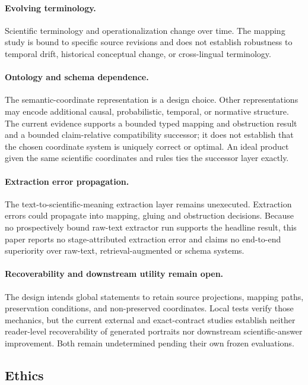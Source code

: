 \paragraph{Evolving terminology.}
Scientific terminology and operationalization change over time. The mapping
study is bound to specific source revisions and does not establish robustness
to temporal drift, historical conceptual change, or cross-lingual terminology.

\paragraph{Ontology and schema dependence.}
The semantic-coordinate representation is a design choice. Other
representations may encode additional causal, probabilistic, temporal, or
normative structure. The current evidence supports a bounded typed mapping and
obstruction result and a bounded claim-relative compatibility successor; it
does not establish that the chosen coordinate system is uniquely correct or
optimal. An ideal product given the same scientific coordinates and rules ties
the successor layer exactly.

\paragraph{Extraction error propagation.}
The text-to-scientific-meaning extraction layer remains unexecuted. Extraction
errors could propagate into mapping, gluing and obstruction decisions. Because
no prospectively bound raw-text extractor run supports the headline result,
this paper reports no stage-attributed extraction error and claims no
end-to-end superiority over raw-text, retrieval-augmented or schema systems.

\paragraph{Recoverability and downstream utility remain open.}
The design intends global statements to retain source projections, mapping
paths, preservation conditions, and non-preserved coordinates. Local tests
verify those mechanics, but the current external and exact-contract studies
establish neither reader-level recoverability of generated portraits nor
downstream scientific-answer improvement. Both remain undetermined pending
their own frozen evaluations.

\subsection{Ethics}

